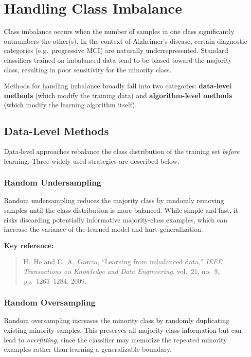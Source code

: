\documentclass[11pt,a4paper]{article}
\begin{document}
\section{Handling Class Imbalance}
 
Class imbalance occurs when the number of samples in one class significantly outnumbers the other(s). In the context of Alzheimer's disease, certain diagnostic categories (e.g.\ progressive MCI) are naturally underrepresented. Standard classifiers trained on imbalanced data tend to be biased toward the majority class, resulting in poor sensitivity for the minority class.
 
Methods for handling imbalance broadly fall into two categories: \textbf{data-level methods} (which modify the training data) and \textbf{algorithm-level methods} (which modify the learning algorithm itself).
 
\subsection{Data-Level Methods}
 
Data-level approaches rebalance the class distribution of the training set \emph{before} learning. Three widely used strategies are described below.
 
\subsubsection{Random Undersampling}
 
Random undersampling reduces the majority class by randomly removing samples until the class distribution is more balanced. While simple and fast, it risks discarding potentially informative majority-class examples, which can increase the variance of the learned model and hurt generalization.
 
\medskip
\noindent\textbf{Key reference:}
\begin{quote}
H.\ He and E.\ A.\ Garcia, ``Learning from imbalanced data,'' \textit{IEEE Transactions on Knowledge and Data Engineering}, vol.~21, no.~9, pp.~1263--1284, 2009.
\end{quote}
 
\subsubsection{Random Oversampling}
 
Random oversampling increases the minority class by randomly duplicating existing minority samples. This preserves all majority-class information but can lead to \emph{overfitting}, since the classifier may memorize the repeated minority examples rather than learning a generalizable boundary.
 
\end{document}
